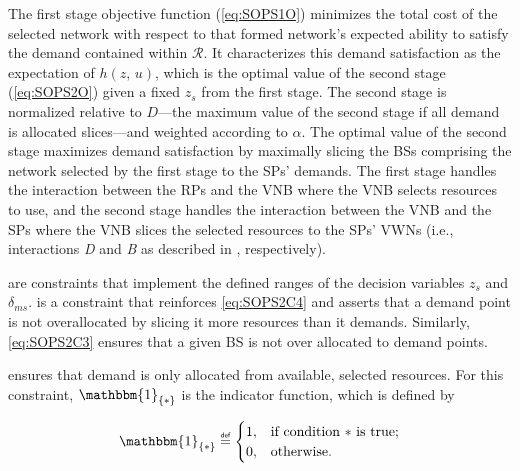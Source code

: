 \documentclass[12pt,dvipsnames]{report}
\newif\ifisdoublespacing
\newcommand\defeq{\mathrel{\overset{\makebox[0pt]{\mbox{\normalfont\tiny\sffamily def}}}{=}}}
\newcommand{\ind}[1]{\mathbbm{1}_{\left\{ #1 \right\}}}
\begin{document}
The first stage objective function (\cref{eq:SOPS1O}) minimizes the total cost of the selected network with respect to that formed network's expected ability to satisfy the demand contained within $\mathcal{R}$.  It characterizes this demand satisfaction as the expectation of $h\left( z,\, u \right)$, which is the optimal value of the second stage (\cref{eq:SOPS2O}) given a fixed $z_s$ from the first stage.  The second stage is normalized relative to $D$---the maximum value of the second stage if all demand is allocated slices---and weighted according to $\alpha$.  The optimal value of the second stage maximizes demand satisfaction by maximally slicing the BSs comprising the network selected by the first stage to the SPs' demands.  The first stage handles the interaction between the RPs and the VNB where the VNB selects resources to use, and the second stage handles the interaction between the VNB and the SPs where the VNB slices the selected resources to the SPs' VWNs (i.e., interactions \emph{D} and \emph{B} as described in , respectively).

 are constraints that implement the defined ranges of the decision variables $z_s$ and $\delta_{ms}$.   is a constraint that reinforces \cref{eq:SOPS2C4} and asserts that a demand point is not overallocated by slicing it more resources than it demands.  Similarly, \cref{eq:SOPS2C3} ensures that a given BS is not over allocated to demand points.

 ensures that demand is only allocated from available, selected resources.  For this constraint, $\ind{*}$ is the indicator function, which is defined by

\ifisdoublespacing
	\begin{singlespacing}
		\begin{equation} \label{eq:indicator}
			\ind{*} \defeq
			\begin{cases}
				1,& \text{if condition $*$ is true;}\\
				\\
				0,& \text{otherwise}.
			\end{cases}
		\end{equation}
	\end{singlespacing}
\else
	\begin{equation} \label{eq:indicator}
		\ind{*} \defeq
		\begin{cases}
			1,& \text{if condition $*$ is true;}\\
			0,& \text{otherwise}.
		\end{cases}
	\end{equation}
\fi
\end{document}
